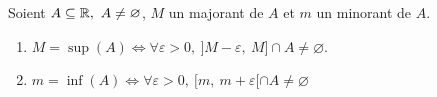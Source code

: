 \begin{proposition}
    Soient $A \subseteq \mathbb{R},\ A \neq \varnothing$, $M$ un majorant de $A$ et $m$ un minorant de $A$.  
    \begin{enumerate}
        \item $M = \sup(A) \iff \forall \varepsilon > 0,\ ]M - \varepsilon,\ M] \cap A \neq \varnothing$.
        \item $m = \inf(A) \iff \forall \varepsilon > 0,\ [m,\ m + \varepsilon[ \cap A \neq \varnothing $
    \end{enumerate}
\end{proposition}